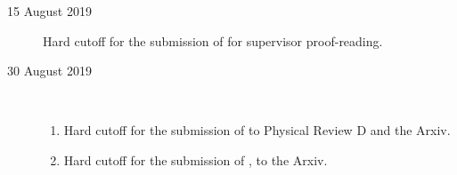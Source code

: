 \documentclass[twoside]{report}
\begin{document}
\begin{multicols}{2}
\begin{enumerate}[resume]
\begin{description}
  \item[15 August 2019] Hard cutoff for the submission of \cite{paper-2} for supervisor proof-reading.
  \item[30 August 2019] \\
    \begin{enumerate}
      \item Hard cutoff for the submission of \cite{paper-2} to Physical Review D and the Arxiv.
      \item Hard cutoff for the submission of \cite{dictionary}, to the Arxiv.
    \end{enumerate}
\end{description}
\end{enumerate}

\end{multicols}
\hline
\begin{multicols}{2}
%


\end{multicols}
\end{document}
